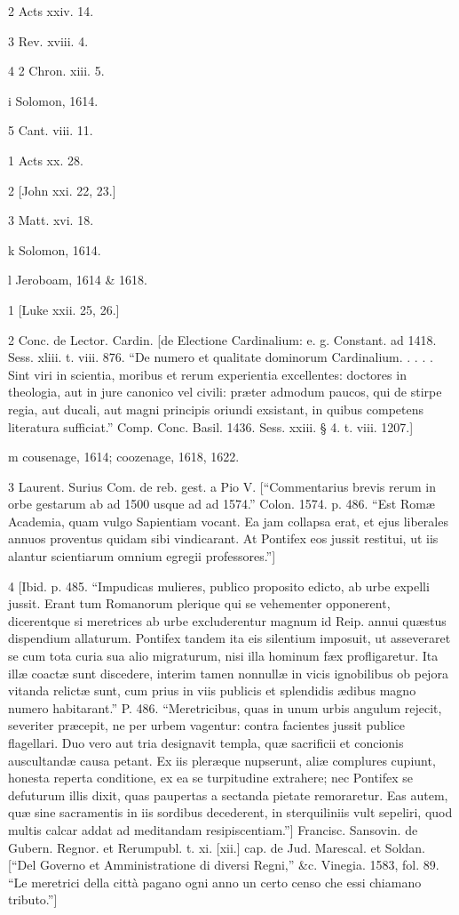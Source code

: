 2
Acts xxiv. 14.

3
Rev. xviii. 4.

4
2 Chron. xiii. 5.

i
Solomon, 1614.

5
Cant. viii. 11.

1
Acts xx. 28.

2
[John xxi. 22, 23.]

3
Matt. xvi. 18.

k
Solomon, 1614.

l
Jeroboam, 1614 & 1618.

1
[Luke xxii. 25, 26.]

2
Conc. de Lector. Cardin. [de Electione Cardinalium: e. g. Constant. ad 1418. Sess. xliii. t. viii. 876. “De numero et qualitate dominorum Cardinalium. . . . . Sint viri in scientia, moribus et rerum experientia excellentes: doctores in theologia, aut in jure canonico vel civili: præter admodum paucos, qui de stirpe regia, aut ducali, aut magni principis oriundi exsistant, in quibus competens literatura sufficiat.” Comp. Conc. Basil. 1436. Sess. xxiii. § 4. t. viii. 1207.]

m
cousenage, 1614; coozenage, 1618, 1622.

3
Laurent. Surius Com. de reb. gest. a Pio V. [“Commentarius brevis rerum in orbe gestarum ab ad 1500 usque ad ad 1574.” Colon. 1574. p. 486. “Est Romæ Academia, quam vulgo Sapientiam vocant. Ea jam collapsa erat, et ejus liberales annuos proventus quidam sibi vindicarant. At Pontifex eos jussit restitui, ut iis alantur scientiarum omnium egregii professores.”]

4
[Ibid. p. 485. “Impudicas mulieres, publico proposito edicto, ab urbe expelli jussit. Erant tum Romanorum plerique qui se vehementer opponerent, dicerentque si meretrices ab urbe excluderentur magnum id Reip. annui quæstus dispendium allaturum. Pontifex tandem ita eis silentium imposuit, ut asseveraret se cum tota curia sua alio migraturum, nisi illa hominum fæx profligaretur. Ita illæ coactæ sunt discedere, interim tamen nonnullæ in vicis ignobilibus ob pejora vitanda relictæ sunt, cum prius in viis publicis et splendidis ædibus magno numero habitarant.” P. 486. “Meretricibus, quas in unum urbis angulum rejecit, severiter præcepit, ne per urbem vagentur: contra facientes jussit publice flagellari. Duo vero aut tria designavit templa, quæ sacrificii et concionis auscultandæ causa petant. Ex iis pleræque nupserunt, aliæ complures cupiunt, honesta reperta conditione, ex ea se turpitudine extrahere; nec Pontifex se defuturum illis dixit, quas paupertas a sectanda pietate remoraretur. Eas autem, quæ sine sacramentis in iis sordibus decederent, in sterquiliniis vult sepeliri, quod multis calcar addat ad meditandam resipiscentiam.”] Francisc. Sansovin. de Gubern. Regnor. et Rerumpubl. t. xi. [xii.] cap. de Jud. Marescal. et Soldan. [“Del Governo et Amministratione di diversi Regni,” &c. Vinegia. 1583, fol. 89. “Le meretrici della città pagano ogni anno un certo censo che essi chiamano tributo.”]

